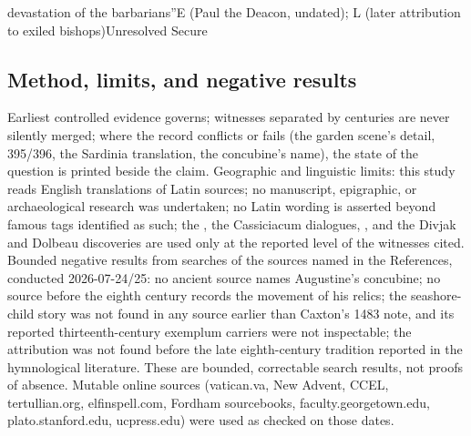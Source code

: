 \begin{lifetimeline}
{devastation of the barbarians''}{E (Paul the Deacon, undated); L (later
attribution to exiled bishops)}{Unresolved}
{Secure}
\end{lifetimeline}

\subsection{Method, limits, and negative results}

Earliest controlled evidence governs; witnesses separated by centuries are
never silently merged; where the record conflicts or fails (the garden
scene's detail, 395/396, the Sardinia translation, the concubine's name),
the state of the question is printed beside the claim. Geographic and
linguistic limits: this study reads English translations of Latin sources;
no manuscript, epigraphic, or archaeological research was undertaken; no
Latin wording is asserted beyond famous tags identified as such; the
, the Cassiciacum dialogues, , and the Divjak and Dolbeau discoveries are used only at the
reported level of the witnesses cited. Bounded negative results from
searches of the sources named in the References, conducted 2026-07-24/25:
no ancient source names Augustine's concubine; no source before the
eighth century records the movement of his relics; the seashore-child
story was not found in any source earlier than Caxton's 1483 note, and
its reported thirteenth-century exemplum carriers were not inspectable;
the  attribution was not found before the late
eighth-century tradition reported in the hymnological literature. These
are bounded, correctable search results, not proofs of absence. Mutable
online sources (vatican.va, New Advent, CCEL, tertullian.org,
elfinspell.com, Fordham sourcebooks, faculty.georgetown.edu, plato.stanford.edu,
ucpress.edu) were used as checked on those dates.

